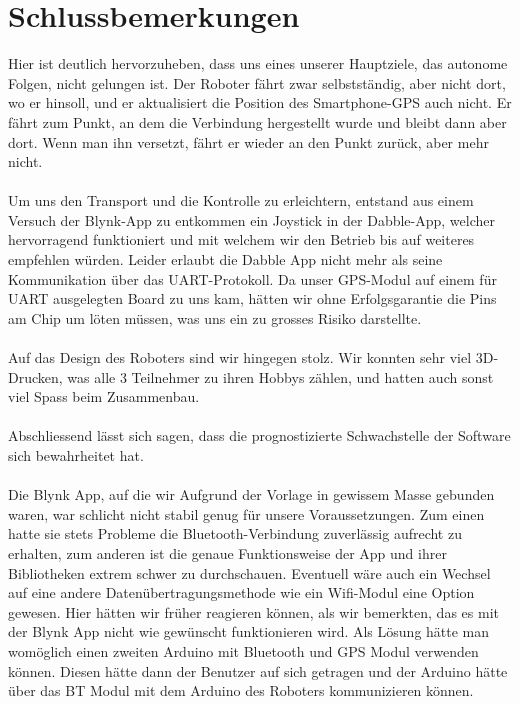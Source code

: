 \section{Schlussbemerkungen}

Hier ist deutlich hervorzuheben, dass uns eines unserer Hauptziele, das autonome Folgen, nicht gelungen ist. Der Roboter fährt zwar selbstständig, aber nicht dort, wo er hinsoll, und er aktualisiert die Position des Smartphone-GPS auch nicht. Er fährt zum Punkt, an dem die Verbindung hergestellt wurde und bleibt dann aber dort. Wenn man ihn versetzt, fährt er wieder an den Punkt zurück, aber mehr nicht.\\
\\
Um uns den Transport und die Kontrolle zu erleichtern, entstand aus einem Versuch der Blynk-App zu entkommen ein Joystick in der Dabble-App, welcher hervorragend funktioniert und mit welchem wir den Betrieb bis auf weiteres empfehlen würden. Leider erlaubt die Dabble App nicht mehr als seine Kommunikation über das UART-Protokoll. Da unser GPS-Modul auf einem für UART ausgelegten Board zu uns kam, hätten wir ohne Erfolgsgarantie die Pins am Chip um löten müssen, was uns ein zu grosses Risiko darstellte.\\
\\
Auf das Design des Roboters sind wir hingegen stolz. Wir konnten sehr viel 3D-Drucken, was alle 3 Teilnehmer zu ihren Hobbys zählen, und hatten auch sonst viel Spass beim Zusammenbau.\\
\\
Abschliessend lässt sich sagen, dass die prognostizierte Schwachstelle der Software sich bewahrheitet hat. \\
\\
Die Blynk App, auf die wir Aufgrund der Vorlage in gewissem Masse gebunden waren, war schlicht nicht stabil genug für unsere Voraussetzungen. Zum einen hatte sie stets Probleme die Bluetooth-Verbindung zuverlässig aufrecht zu erhalten, zum anderen ist die genaue Funktionsweise der App und ihrer Bibliotheken extrem schwer zu durchschauen. Eventuell wäre auch ein Wechsel auf eine andere Datenübertragungsmethode wie ein Wifi-Modul eine Option gewesen. Hier hätten wir früher reagieren können, als wir bemerkten, das es mit der Blynk App nicht wie gewünscht funktionieren wird. Als Lösung hätte man womöglich einen zweiten Arduino mit Bluetooth und GPS Modul verwenden können. Diesen hätte dann der Benutzer auf sich getragen und der Arduino hätte über das BT Modul mit dem Arduino des Roboters kommunizieren können.\\
